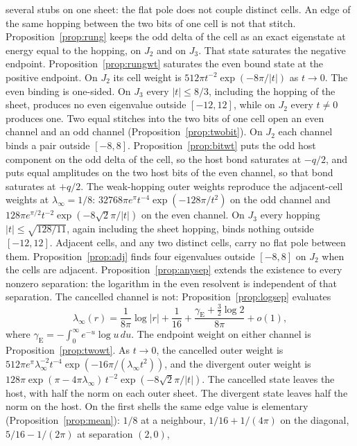 several stubs on one sheet: the flat pole does not couple distinct cells.
An edge of the same hopping between the two bits of one cell is not that
stitch.
Proposition~\ref{prop:rung} keeps the odd delta of the cell as an exact
eigenstate at energy equal to the hopping, on \(J_2\) and on \(J_3\).
That state saturates the negative endpoint.
Proposition~\ref{prop:rungwt} saturates the even bound state at the
positive endpoint.
On \(J_2\) its cell weight is \(512\pi t^{-2}\exp(-8\pi/|t|)\) as \(t\to 0\).
The even binding is one-sided.
On \(J_3\) every \(|t|\le 8/3\), including the hopping of the sheet, produces
no even eigenvalue outside \([-12,12]\), while on \(J_2\) every \(t\neq 0\)
produces one.
Two equal stitches into the two bits of one cell open an even channel and
an odd channel (Proposition~\ref{prop:twobit}).
On \(J_2\) each channel binds a pair outside \([-8,8]\).
Proposition~\ref{prop:bitwt} puts the odd host component on the odd delta
of the cell, so the host bond saturates at \(-q/2\), and puts equal
amplitudes on the two host bits of the even channel, so that bond
saturates at \(+q/2\).
The weak-hopping outer weights reproduce the adjacent-cell weights at
\(\lambda_\infty=1/8\): \(32768\pi e^{\pi}t^{-4}\exp(-128\pi/t^2)\) on the
odd channel and \(128\pi e^{\pi/2}t^{-2}\exp(-8\sqrt{2}\pi/|t|)\) on the
even channel.
On \(J_3\) every hopping \(|t|\le\sqrt{128/11}\), again including the sheet
hopping, binds nothing outside \([-12,12]\).
Adjacent cells, and any two distinct cells, carry no flat pole between
them.
Proposition~\ref{prop:adj} finds four eigenvalues outside \([-8,8]\)
on \(J_2\) when the cells are adjacent.
Proposition~\ref{prop:anysep} extends the existence to every nonzero
separation: the logarithm in the even resolvent is independent of that
separation.
The cancelled channel is not: Proposition~\ref{prop:logsep} evaluates
\[
\lambda_\infty(r)
=\frac1{8\pi}\log|r|
+\frac1{16}
+\frac{\gamma_{\mathrm{E}}+\frac32\log 2}{8\pi}
+o(1),
\]
where \(\gamma_{\mathrm{E}}=-\int_0^\infty e^{-u}\log u\,du\).
The endpoint weight on either channel is Proposition~\ref{prop:twowt}.
As \(t\to 0\), the cancelled outer weight is
\(512\pi e^{\pi}\lambda_\infty^{-2}t^{-4}\exp(-16\pi/(\lambda_\infty t^2))\),
and the divergent outer weight is
\(128\pi\exp(\pi-4\pi\lambda_\infty)\,t^{-2}\exp(-8\sqrt{2}\pi/|t|)\).
The cancelled state leaves the host, with half the norm on each outer
sheet.
The divergent state leaves half the norm on the host.
On the first shells the same edge value is elementary
(Proposition~\ref{prop:mean}): \(1/8\) at a neighbour,
\(1/16+1/(4\pi)\) on the diagonal, \(5/16-1/(2\pi)\) at separation \((2,0)\),
